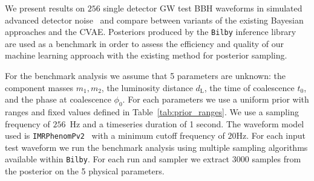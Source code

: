 \documentclass[%
showpacs,
 amsmath,amssymb,
 aps,
 twocolumn,
 prl,
 reprint,
floatfix,
]{revtex4-1}
\newcommand{\chris}[1]{\textbf{\textcolor{red}{CHRIS: #1}}}
\begin{document}
%
%

%
%
%
%
We present results on $256$ single detector \ac{GW} test \ac{BBH} waveforms in
simulated advanced detector noise~\cite{aligo_noisecurves} and compare between
variants of the existing Bayesian approaches and the \ac{CVAE}. Posteriors
produced by the \texttt{Bilby} inference library~\cite{1811.02042} are used as
a benchmark in order to assess the efficiency and quality of our machine
learning approach with the existing method for posterior sampling.

%
%
For the benchmark analysis we assume that 5 parameters are unknown: the
component masses $m_1,m_2$, the luminosity distance $d_{\text{L}}$, the time of
coalescence $t_{0}$, and the phase at coalescence $\phi_0$. For each
parameters we use a uniform prior with ranges and fixed values defined in
Table~\ref{tab:prior_ranges}.
We use a sampling frequency of $256$~Hz and a timeseries duration of 1 second.
The waveform model used is \texttt{IMRPhenomPv2}~\cite{1809.10113} with a
minimum cutoff frequency of $20$Hz. For each input test waveform we run the
benchmark analysis using multiple sampling algorithms available within
\texttt{Bilby}. For each run and sampler we extract $3000$ samples from the
posterior on the 5 physical parameters.  
\end{document}
